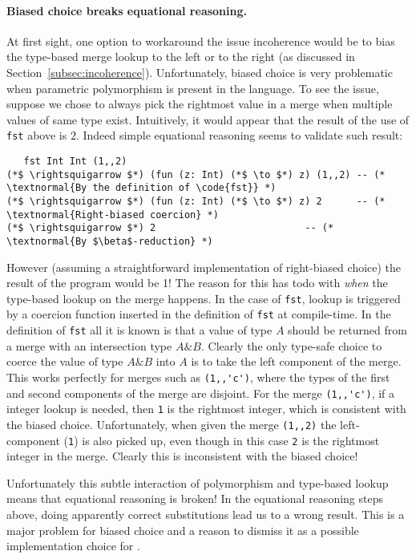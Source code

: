 \paragraph{Biased choice breaks equational reasoning.} At first sight, one option
to workaround the issue incoherence would be to bias the type-based merge lookup
to the left or to the right (as discussed in
Section~\ref{subsec:incoherence}). Unfortunately, biased choice is
very problematic when parametric polymorphism is present in the language.
To see the issue, suppose we chose to always pick the
rightmost value in a merge when multiple values of same type exist.
Intuitively, it would appear that the result of the use of
\lstinline{fst} above is $2$. Indeed simple equational reasoning
seems to validate such result:
\begin{lstlisting}
   fst Int Int (1,,2)
(*$ \rightsquigarrow $*) (fun (z: Int) (*$ \to $*) z) (1,,2) -- (* \textnormal{By the definition of \code{fst}} *)
(*$ \rightsquigarrow $*) (fun (z: Int) (*$ \to $*) z) 2      -- (* \textnormal{Right-biased coercion} *)
(*$ \rightsquigarrow $*) 2                          -- (* \textnormal{By $\beta$-reduction} *)
\end{lstlisting}

However (assuming a straightforward implementation of right-biased
choice) the result of the program would be 1! The reason for this has
todo with \emph{when} the type-based lookup on the merge happens. In
the case of \lstinline{fst}, lookup is triggered by a coercion
function inserted in the definition of \lstinline{fst} at
compile-time.
In the definition of \lstinline$fst$ all it is known is that a
value of type $A$ should be returned from a merge with an intersection
type $A\&B$.  Clearly the only type-safe choice to coerce the value of
type $A\&B$ into $A$ is to
take the left component of the merge. This works perfectly for merges
such as \lstinline$(1,,'c')$, where the types of the first and second components
of the merge are disjoint. For the merge \lstinline$(1,,'c')$, if a integer lookup
is needed, then \lstinline$1$ is the rightmost integer, which is consistent with the
biased choice. Unfortunately, when given the merge \lstinline$(1,,2)$ the
left-component (\lstinline$1$) is also picked up, even though in this case \lstinline$2$
is the rightmost integer in the merge. Clearly this is inconsistent
with the biased choice!

Unfortunately this subtle interaction of polymorphism and type-based lookup
 means that equational reasoning is broken!
In the equational reasoning steps above, doing apparently correct
substitutions lead us to a wrong result. This is a major problem for
biased choice and a reason to dismiss it as a possible implementation
choice for \namedis.

